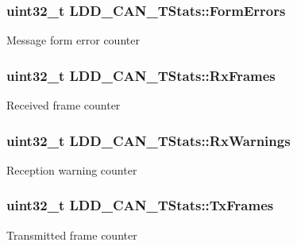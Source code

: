 \subsubsection[{\texorpdfstring{Form\+Errors}{FormErrors}}]{\setlength{\rightskip}{0pt plus 5cm}uint32\+\_\+t L\+D\+D\+\_\+\+C\+A\+N\+\_\+\+T\+Stats\+::\+Form\+Errors}\hypertarget{struct_l_d_d___c_a_n___t_stats_a0d783d7e8813ded41cdac8181bab524a}{}\label{struct_l_d_d___c_a_n___t_stats_a0d783d7e8813ded41cdac8181bab524a}
Message form error counter 
\subsubsection[{\texorpdfstring{Rx\+Frames}{RxFrames}}]{\setlength{\rightskip}{0pt plus 5cm}uint32\+\_\+t L\+D\+D\+\_\+\+C\+A\+N\+\_\+\+T\+Stats\+::\+Rx\+Frames}\hypertarget{struct_l_d_d___c_a_n___t_stats_ad5fce5f144966e6ef1ebd3559573c5cc}{}\label{struct_l_d_d___c_a_n___t_stats_ad5fce5f144966e6ef1ebd3559573c5cc}
Received frame counter 
\subsubsection[{\texorpdfstring{Rx\+Warnings}{RxWarnings}}]{\setlength{\rightskip}{0pt plus 5cm}uint32\+\_\+t L\+D\+D\+\_\+\+C\+A\+N\+\_\+\+T\+Stats\+::\+Rx\+Warnings}\hypertarget{struct_l_d_d___c_a_n___t_stats_a9454eaee94ea556f10485bd8608bf980}{}\label{struct_l_d_d___c_a_n___t_stats_a9454eaee94ea556f10485bd8608bf980}
Reception warning counter 
\subsubsection[{\texorpdfstring{Tx\+Frames}{TxFrames}}]{\setlength{\rightskip}{0pt plus 5cm}uint32\+\_\+t L\+D\+D\+\_\+\+C\+A\+N\+\_\+\+T\+Stats\+::\+Tx\+Frames}\hypertarget{struct_l_d_d___c_a_n___t_stats_ad6e8656da94718393be3b05ef07a5fe0}{}\label{struct_l_d_d___c_a_n___t_stats_ad6e8656da94718393be3b05ef07a5fe0}
Transmitted frame counter 
